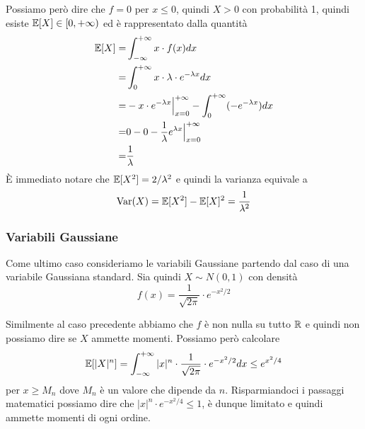 Possiamo però dire che $f = 0$ per $x \leq 0$, quindi $X > 0$ con probabilità 1, quindi esiste
$\mathbb{E}[X] \in [0, +\infty)$ ed è rappresentato dalla quantità
\begin{align*}
	\mathbb{E}[X] = & \int_{-\infty}^{+\infty} x \cdot f(x) dx                      \\
	=       & \int_0^{+\infty} x \cdot \lambda \cdot e^{-\lambda x} dx      \\
	=       & -x \cdot e^{-\lambda x} \Big|_{x=0}^{+\infty} -
	\int_{0}^{+\infty} (-e^{-\lambda x}) dx                                 \\
	=       & 0 - 0 - \frac{1}{\lambda} e^{\lambda x} \Big|_{x=0}^{+\infty} \\
	=       & \frac{1}{\lambda}
\end{align*}
\`E immediato notare che $\mathbb{E}[X^2] = 2 / \lambda^2$ e quindi la varianza equivale a
\[ \operatorname{Var}(X) = \mathbb{E}[X^2] - \mathbb{E}[X]^2 = \frac{1}{\lambda^2} \]

\subsubsection{Variabili Gaussiane}
Come ultimo caso consideriamo le variabili Gaussiane partendo dal caso di una variabile Gaussiana
standard. Sia quindi $X \sim N(0,1)$ con densità
\[ f(x) = \frac{1}{\sqrt{2 \pi}} \cdot e^{-x^2 / 2} \]
\begin{center}
\end{center}
Similmente al caso precedente abbiamo che $f$ è non nulla su tutto $\mathbb{R}$ e quindi non possiamo dire
se $X$ ammette momenti. Possiamo però calcolare
\[
	\mathbb{E}[|X|^n] = \int_{-\infty}^{+\infty} |x|^n \cdot
	\frac{1}{\sqrt{2 \pi}} \cdot e^{-x^2 / 2} dx \leq e^{x^2 / 4}
\]
per $x \geq M_n$ dove $M_n$ è un valore che dipende da $n$. Risparmiandoci i passaggi matematici
possiamo dire che $|x|^n \cdot e^{-x^2 / 4} \leq 1$, è dunque limitato e quindi ammette momenti di
ogni ordine.

